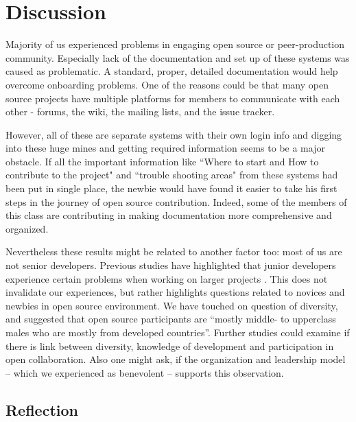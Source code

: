 \section{Discussion}

Majority of us experienced problems in engaging open source or peer-production community. Especially lack of the documentation and set up of these systems was caused as problematic. A standard, proper, detailed documentation  would help overcome onboarding problems. One of the reasons could be  that many open source projects have multiple platforms for members to communicate with each other - forums, the wiki, the mailing lists, and the issue tracker.

However, all of these are separate systems with their own login info and digging into these huge mines and getting required information seems to be a major obstacle. If all the important information like ``Where to start and How to contribute to the project" and ``trouble shooting areas" from these systems had been put in single place, the newbie would have found it easier to take his first steps in the journey of open source contribution. Indeed, some of the members of this class are contributing in making documentation more comprehensive and organized.

Nevertheless these results might be related to another factor too: most of us are not senior developers. Previous studies have highlighted that junior developers experience certain problems when working on larger projects \cite{Begel2008}. This does not invalidate our experiences, but rather highlights questions related to novices and newbies in open source environment. We have touched on question of diversity, and suggested that open source participants are ``mostly middle- to upperclass males who are mostly from developed countries''. Further studies could examine if there is link between diversity, knowledge of development and participation in open collaboration. Also one might ask, if the organization and leadership model -- which we experienced as benevolent -- supports this observation.




\subsection{Reflection}
\label{sec:reflection}





